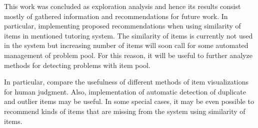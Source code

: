 \documentclass[
  digital, %
  table,   %
  nolof,     %
  nolot,     %
  nocover,
  color,
  final, %
]{fithesis3}
\begin{document}

This work was concluded as exploration analysis and hence its results consist mostly of gathered information and recommendations for future work. In particular, implementing proposed recommendations when using similarity of items in mentioned tutoring system. The similarity of items is currently not used in the system \umimeCesky{} but increasing number of items will soon call for some automated management of problem pool. For this reason, it will be useful to further analyze methods for detecting problems with item pool.

In particular, compare the usefulness of different methods of item visualizations for human judgment. Also, implementation of automatic detection of duplicate and outlier items may be useful. In some special cases, it may be even possible to recommend kinds of items that are missing from the system using similarity of items.




\makeatletter\thesis@blocks@clear\makeatother

\end{document}
